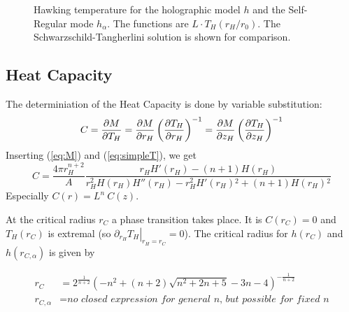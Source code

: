 \documentclass[10pt,a4paper, fleqn]{article}
\begin{document}
\begin{figure}[h]
\center%
\caption{Hawking temperature for the holographic model $h$ and the Self-Regular mode $h_\alpha$. The functions are $L \cdot T_H(r_H/r_0)$. The Schwarzschild-Tangherlini solution is shown for comparison.
}\label{fig:th}
\end{figure}

\newpage
\subsection{Heat Capacity}
The determiniation of the Heat Capacity is done by variable substitution:
%
\begin{equation}
C = \frac{\partial M}{\partial T_H} = \frac{\partial M}{\partial r_H}\left(\frac{\partial T_H}{\partial r_H}\right)^{-1} \label{eq:C}
= \frac{\partial M}{\partial z_H} \left(\frac{\partial T_H}{\partial z_H}\right)^{-1}
\end{equation}
%
Inserting (\ref{eq:M}) and (\ref{eq:simpleT}), we get
%
\begin{equation}
C = 
\frac{4\pi r_H^{n+2}}{A}
\frac{r_H H'\left(r_H\right)-(n+1) H\left(r_H\right)}
   {r_H^2 H\left(r_H\right)
   H''\left(r_H\right)-r_H^2 H'\left(r_H\right){}^2+(n+1) H\left(r_H\right){}^2}
\end{equation}
%
Especially $C(r) = L^n~C(z)$.

At the critical radius $r_C$ a phase transition takes place. It is $C(r_C) = 0$ and $T_H(r_C)$ is extremal (so $\left. \partial_{r_H} T_H \right|_{r_H=r_C}=0$). The critical radius for $h(r_C)$ and $h(r_{C,\alpha})$ is given by

\begin{align}
r_C & = 2^{\frac{1}{n+2}} \left(-n^2+(n+2) \sqrt{n^2+2 n+5}-3 n-4\right)^{-\frac{1}{n+2}} \\
r_{C,\alpha} &= \textit{no closed expression for general n, but possible for fixed n}
\end{align}
\end{document}

